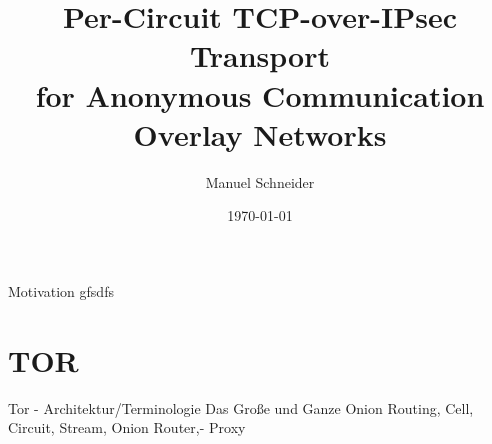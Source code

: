 \documentclass{beamer}
\title{Per-Circuit TCP-over-IPsec Transport\\for Anonymous Communication Overlay Networks}
\author{Manuel Schneider}
\institute{Albert Ludwigs Universität - Institut für Informatik}
\date{\today}
\begin{document}

\begin{frame}[plain]
  \titlepage
\end{frame}


\begin{frame}{Motivation}
gfsdfs
\end{frame}

\section{TOR}



\begin{frame}{Tor - Architektur/Terminologie}
Das Große und Ganze
Onion Routing, Cell, Circuit, Stream, Onion Router,- Proxy
\end{frame}
\end{document}
